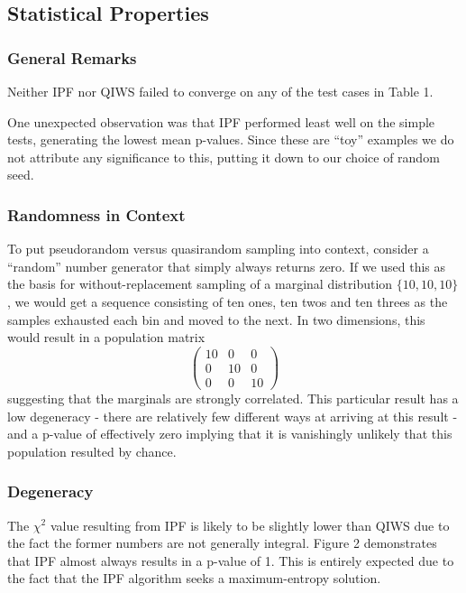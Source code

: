 \documentclass{JASSS}
\begin{document}
\subsection{Statistical Properties}\label{statistical-properties-1}

\subsubsection{General Remarks}\label{general-remarks}

Neither IPF nor QIWS failed to converge on any of the test cases in
Table 1.

One unexpected observation was that IPF performed least well on the
simple tests, generating the lowest mean p-values. Since these are
``toy'' examples we do not attribute any significance to this, putting
it down to our choice of random seed.

\subsubsection{Randomness in Context}\label{randomness-in-context}

To put pseudorandom versus quasirandom sampling into context, consider a
``random'' number generator that simply always returns zero. If we used
this as the basis for without-replacement sampling of a marginal
distribution \(\lbrace10,10,10\rbrace\), we would get a sequence
consisting of ten ones, ten twos and ten threes as the samples exhausted
each bin and moved to the next. In two dimensions, this would result in
a population matrix
\[\left( \begin{array}{ccc}
10 & 0 & 0 \\
0 & 10 & 0 \\
0 & 0 & 10 \end{array} \right)\]
suggesting that the marginals are strongly correlated. This particular
result has a low degeneracy - there are relatively few different ways at
arriving at this result - and a p-value of effectively zero implying
that it is vanishingly unlikely that this population resulted by chance.

\subsubsection{Degeneracy}\label{degeneracy}

The \(\chi^2\) value resulting from IPF is likely to be slightly lower
than QIWS due to the fact the former numbers are not generally integral.
Figure 2 demonstrates that IPF almost always results in a p-value of 1.
This is entirely expected due to the fact that the IPF algorithm seeks a 
maximum-entropy solution.
\end{document}

